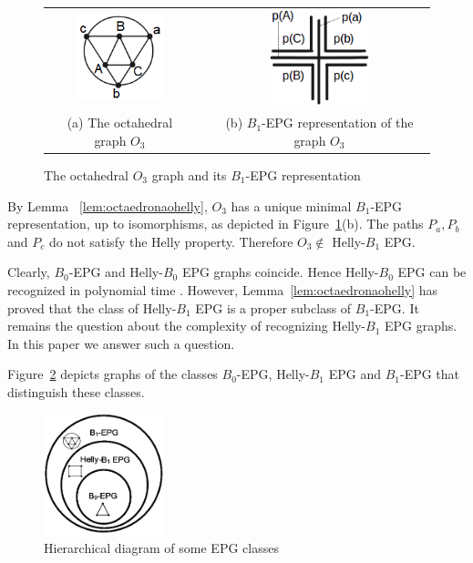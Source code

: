 \documentclass[
submission
]{dmtcs-episciences}
\begin{document}
 \begin{figure}[h]
  \centering
  
  \begin{tabular}{@{}c@{} p{1.5cm} @{}c@{} }
   \centering \includegraphics[width=2.5cm]{octaedro} & &\includegraphics[width=2.9cm]{representacaoOctaedro}  \\[\abovecaptionskip]
    \footnotesize \centering (a) The octahedral  graph $O_3$  & &  \footnotesize(b) $B_1$-EPG representation of the graph $O_3$
  \end{tabular}

 \caption{The octahedral $O_3$ graph and its  $B_1$-EPG representation}\label{fig:octaedro}
\end{figure}
 

By Lemma ~\ref{lem:octaedronaohelly},  $ O_3 $ has a unique minimal $B_1$-EPG representation, up to isomorphisms, as depicted in Figure~\ref{fig:octaedro}(b). The paths $ P_{a}, P_{b} $ and $ P_{c} $  do not satisfy the Helly property. Therefore $O_3 \notin$ Helly-$B_1$ EPG. 

Clearly, $B_0$-EPG and Helly-$B_0$ EPG graphs coincide. Hence Helly-$B_0$ EPG can be recognized in polynomial time \cite{booth1976}. However, Lemma~\ref{lem:octaedronaohelly} has proved that the class of Helly-$B_1$ EPG is a proper subclass of $B_1$-EPG. It remains the question about the complexity of recognizing Helly-$B_1$ EPG graphs. In this paper we answer such a question.

Figure~\ref{fig:diagramaEPG} depicts graphs of the classes $B_0$-EPG,  Helly-$B_1$ EPG and $B_1$-EPG that distinguish these classes.

%
\begin{figure}[H]	
\center%
\includegraphics[width=3.5cm]{diagramaClassesEPG1} %
\caption{Hierarchical diagram of some EPG classes}
\label{fig:diagramaEPG}
\end{figure}
\end{document}
